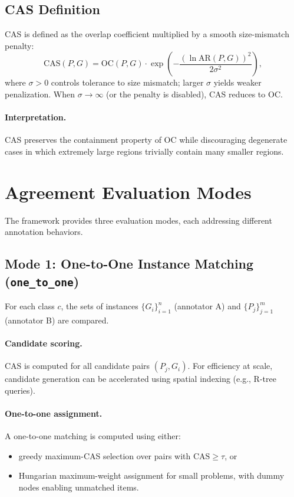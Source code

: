 \documentclass[11pt]{article}
\begin{document}
\subsection{CAS Definition}
CAS is defined as the overlap coefficient multiplied by a smooth size-mismatch penalty:
\begin{equation}
\mathrm{CAS}(P,G) = \mathrm{OC}(P,G)\cdot \exp\left(-\frac{(\ln \mathrm{AR}(P,G))^2}{2\sigma^2}\right),
\end{equation}
where $\sigma>0$ controls tolerance to size mismatch; larger $\sigma$ yields weaker penalization.
When $\sigma \rightarrow \infty$ (or the penalty is disabled), CAS reduces to $\mathrm{OC}$.

\paragraph{Interpretation.}
CAS preserves the containment property of $\mathrm{OC}$ while discouraging degenerate cases in which extremely large regions trivially contain many smaller regions.

\section{Agreement Evaluation Modes}
The framework provides three evaluation modes, each addressing different annotation behaviors.

\subsection{Mode 1: One-to-One Instance Matching (\texttt{one\_to\_one})}
For each class $c$, the sets of instances $\{G_i\}_{i=1}^{n}$ (annotator A) and $\{P_j\}_{j=1}^{m}$ (annotator B) are compared.

\paragraph{Candidate scoring.}
CAS is computed for all candidate pairs $(P_j,G_i)$.
For efficiency at scale, candidate generation can be accelerated using spatial indexing (e.g., R-tree queries).

\paragraph{One-to-one assignment.}
A one-to-one matching is computed using either:
\begin{itemize}[leftmargin=*]
  \item greedy maximum-CAS selection over pairs with $\mathrm{CAS}\ge\tau$, or
  \item Hungarian maximum-weight assignment for small problems, with dummy nodes enabling unmatched items.
\end{itemize}
\end{document}
